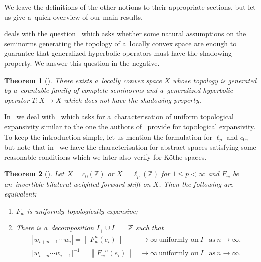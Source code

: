 \documentclass[11pt,a4paper]{amsart}
\newtheorem*{theorem*}{Theorem}
\theoremstyle{definition}
\newcommand{\Z}{\mathbb{Z}}
\newcommand{\abs}[1]{\left| #1 \right|}
\newcommand{\norm}[1]{\left\| #1 \right\|}
\begin{document}
	We leave the definitions of the other notions to their appropriate sections, but let us give a~quick overview of our main results.
	
	 deals with the question~\cite[Problem~C]{Darji} which asks whether some natural assumptions on the seminorms generating the topology of a~locally convex space are enough to guarantee that generalized hyperbolic operators must have the shadowing property. We answer this question in the negative.
	\begin{theorem*}[{}]
		There exists a~locally convex space $X$ whose topology is generated by a~countable family of complete seminorms and a~generalized hyperbolic operator $T: X \to X$ which does not have the shadowing property.
	\end{theorem*}
	
	In~ we deal with~\cite[Problem~E]{Darji} which asks for a~characterisation of uniform topological expansivity similar to the one the authors of~\cite{Darji} provide for topological expansivity. To keep the introduction simple, let us mention the formulation for $\ell_p$ and $c_0$, but note that in~ we have the characterisation for abstract spaces satisfying some reasonable conditions which we later also verify for K\"othe spaces.
	\begin{theorem*}[{}]
		Let $X = c_0(\Z)$ or $X = \ell_p(\Z)$ for $1 \leq p < \infty$ and $F_w$ be an~invertible bilateral weighted forward shift on $X$. Then the following are equivalent:
		\begin{enumerate}
			\item \(F_w\) is uniformly topologically expansive;
			\item There is a~decomposition \(I_{+} \cup I_{-} =\Z\) such that
			\begin{align*}
				\abs{w_{i+n-1} \cdots w_{i}} = \norm{F_w^n(e_i)} &\to \infty \ \text{uniformly on} \ I_+ \ \text{as} \ n \to \infty, \\
				\abs{w_{i-n} \cdots w_{i-1}}^{-1} = \norm{F_w^{-n}(e_i)} &\to \infty \ \text{uniformly on} \ I_- \ \text{as} \ n \to \infty.
			\end{align*}
		\end{enumerate}
	\end{theorem*}
	
\end{document}
